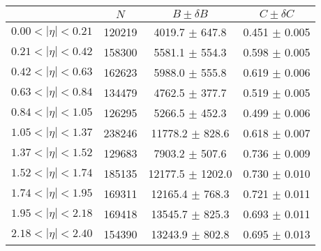 \begin{tabular}{lccc}
\hline
    &   $N$   & $B \pm \delta B$  &  $C \pm \delta C$ \\
\hline
$0.00 < |\eta| <0.21$          & 120219     & 4019.7     $\pm$ 647.8 & 0.451      $\pm$ 0.005 \\
$0.21 < |\eta| <0.42$          & 158300     & 5581.1     $\pm$ 554.3 & 0.598      $\pm$ 0.005 \\
$0.42 < |\eta| <0.63$          & 162623     & 5988.0     $\pm$ 555.8 & 0.619      $\pm$ 0.006 \\
$0.63 < |\eta| <0.84$          & 134479     & 4762.5     $\pm$ 377.7 & 0.519      $\pm$ 0.005 \\
$0.84 < |\eta| <1.05$          & 126295     & 5266.5     $\pm$ 452.3 & 0.499      $\pm$ 0.006 \\
$1.05 < |\eta| <1.37$          & 238246     & 11778.2    $\pm$ 828.6 & 0.618      $\pm$ 0.007 \\
$1.37 < |\eta| <1.52$          & 129683     & 7903.2     $\pm$ 507.6 & 0.736      $\pm$ 0.009 \\
$1.52 < |\eta| <1.74$          & 185135     & 12177.5    $\pm$ 1202.0 & 0.730      $\pm$ 0.010 \\
$1.74 < |\eta| <1.95$          & 169311     & 12165.4    $\pm$ 768.3 & 0.721      $\pm$ 0.011 \\
$1.95 < |\eta| <2.18$          & 169418     & 13545.7    $\pm$ 825.3 & 0.693      $\pm$ 0.011 \\
$2.18 < |\eta| <2.40$          & 154390     & 13243.9    $\pm$ 802.8 & 0.695      $\pm$ 0.013 \\
\hline
\end{tabular}
